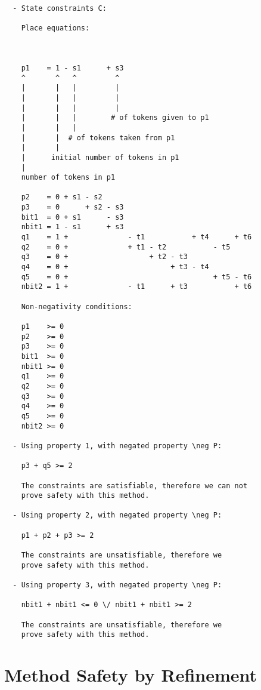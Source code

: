 \begin{verbatim}
  - State constraints C:

    Place equations:
  


    p1    = 1 - s1      + s3
    ^       ^   ^         ^
    |       |   |         |
    |       |   |         |
    |       |   |         |
    |       |   |        # of tokens given to p1
    |       |   |    
    |       |  # of tokens taken from p1
    |       |
    |      initial number of tokens in p1
    |
    number of tokens in p1

    p2    = 0 + s1 - s2
    p3    = 0      + s2 - s3
    bit1  = 0 + s1      - s3
    nbit1 = 1 - s1      + s3
    q1    = 1 +              - t1           + t4      + t6
    q2    = 0 +              + t1 - t2           - t5
    q3    = 0 +                   + t2 - t3
    q4    = 0 +                        + t3 - t4
    q5    = 0 +                                  + t5 - t6
    nbit2 = 1 +              - t1      + t3           + t6
    
    Non-negativity conditions:
  
    p1    >= 0
    p2    >= 0
    p3    >= 0
    bit1  >= 0
    nbit1 >= 0
    q1    >= 0
    q2    >= 0
    q3    >= 0
    q4    >= 0
    q5    >= 0
    nbit2 >= 0

  - Using property 1, with negated property \neg P:

    p3 + q5 >= 2

    The constraints are satisfiable, therefore we can not
    prove safety with this method.

  - Using property 2, with negated property \neg P:

    p1 + p2 + p3 >= 2
    
    The constraints are unsatisfiable, therefore we
    prove safety with this method.
  
  - Using property 3, with negated property \neg P:

    nbit1 + nbit1 <= 0 \/ nbit1 + nbit1 >= 2
    
    The constraints are unsatisfiable, therefore we
    prove safety with this method.
\end{verbatim}

\newpage

\section{Method Safety by Refinement}

